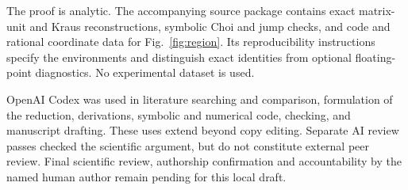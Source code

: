 \documentclass[11pt]{article}
\begin{document}
The proof is analytic. The accompanying source package contains exact
matrix-unit and Kraus reconstructions, symbolic Choi and jump checks,
and code and rational coordinate data for Fig.~\ref{fig:region}.
Its reproducibility instructions specify the environments and distinguish
exact identities from optional floating-point diagnostics. No experimental
dataset is used.

OpenAI Codex was used in literature searching and comparison, formulation
of the reduction, derivations, symbolic and numerical code, checking,
and manuscript drafting. These uses extend beyond copy editing.
Separate AI review passes checked the scientific argument, but do not
constitute external peer review. Final scientific review, authorship
confirmation and accountability by the named human author remain pending
for this local draft.



\end{document}
